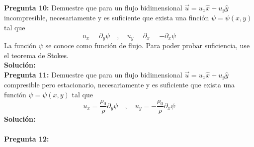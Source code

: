 \documentclass[11pt,letterpaper]{article}
\begin{document}

\textbf{Pregunta 10:} Demuestre que para un flujo bidimensional $\vec{u}=u_x\hat{x}+u_y\hat{y}$ incompresible, necesariamente y es suficiente que exista una finción $\psi=\psi(x,y)$ tal que
\begin{equation}
  u_x=\partial_y\psi \quad, \quad u_y=\partial_x=-\partial_x\psi
\end{equation}
La función $\psi$ se conoce como función de flujo. Para poder probar suficiencia, use el teorema de Stokes. \\
\textbf{Solución:}
\\
\textbf{Pregunta 11:} Demuestre que para un flujo bidimensional $\vec{u}=u_x\hat{x} + u_y\hat{y}
$ compresible pero estacionario, necesariamente y es suficiente que exista una función $\psi=\psi(x,y)$ tal que
\begin{equation}
  u_x=\frac{\rho_0}{\rho}\partial_y\psi\quad , \quad u_y=-\frac{\rho_0}{\rho}\partial_x\psi
\end{equation}
\textbf{Solución:} \\
\\

\textbf{Pregunta 12:}
\end{document}
